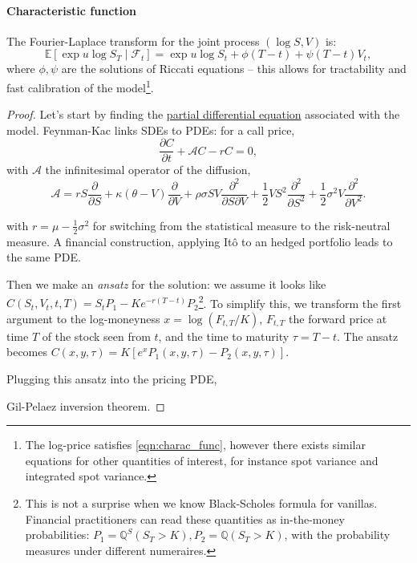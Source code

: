 \paragraph{Characteristic function} The Fourier-Laplace transform for the joint process $(\log S, V)$ is:
\begin{equation}\label{eqn:charac_func}
    \mathbb{E}\left[\exp{u \log S_T} \mid \mathcal{F}_t\right] = \exp{u \log S_t + \phi (T-t) + \psi (T-t)V_t},
\end{equation}
where $\phi, \psi$ are the solutions of Riccati equations -- this allows for tractability and fast calibration of the model\footnote{The log-price satisfies \ref{eqn:charac_func}, however there exists similar equations for other quantities of interest, for instance spot variance and integrated spot variance.}.

\begin{proof}
    Let's start by finding the \underline{partial differential equation} associated with the model. Feynman-Kac links SDEs to PDEs: for a call price,
    \[
        \dfrac{\partial C}{\partial t} + \mathcal{A}C - rC = 0,
    \]
    with $\mathcal{A}$ the infinitesimal operator of the diffusion,
    \[\mathcal{A} = rS \dfrac{\partial}{\partial S} + \kappa(\theta - V) \dfrac{\partial}{\partial V} + \rho \sigma S V \dfrac{\partial^2}{\partial S \partial V} + \dfrac1{2} V S^2 \dfrac{\partial^2}{\partial S^2} + \dfrac1{2} \sigma^2 V \dfrac{\partial^2}{\partial V^2}.\]


    with $r = \mu - \frac1{2}\sigma^2$ for switching from the statistical measure to the risk-neutral measure. A financial construction, applying It\^o to an hedged portfolio leads to the same PDE.


    Then we make an \textit{ansatz} for the solution: we assume it looks like $C(S_t, V_t, t, T) = S_t P_1 - K e^{-r(T-t)} P_2$\footnote{This is not a surprise when we know Black-Scholes formula for vanillas. Financial practitioners can read these quantities as in-the-money probabilities: $P_1 = \mathbb{Q}^S(S_T > K), P_2 = \mathbb{Q}(S_T > K)$, with the probability measures under different numeraires.}. To simplify this, we transform the first argument to the log-moneyness $x=\log(F_{t,T} / K)$, $F_{t,T}$ the forward price at time $T$ of the stock seen from $t$, and the time to maturity $\tau = T-t$. The ansatz becomes $C(x,y,\tau) = K\left[e^x P_1(x,y,\tau) - P_2(x,y,\tau)\right]$.

    Plugging this ansatz into the pricing PDE,

    Gil-Pelaez inversion theorem.
\end{proof}


